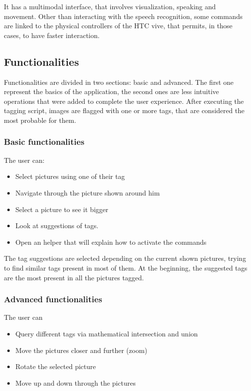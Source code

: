 \documentclass[11pt,a4paper]{article}
\begin{document}
It has a multimodal interface, that involves visualization, speaking and movement.
Other than interacting with the speech recognition, some commands are linked to the physical controllers of the HTC vive, that permits, in those cases, to have faster interaction.

\subsection{Functionalities}
Functionalities are divided in two sections: basic and advanced.
The first one represent the basics of the application, the second ones are less intuitive operations that were added to complete the user experience.
After executing the tagging script, images are flagged with one or more tags, that are considered the most probable for them.

\subsubsection{Basic functionalities}

The user can:
\begin{itemize}
\item Select pictures using one of their tag
\item Navigate through the picture shown around him
\item Select a picture to see it bigger 
\item Look at suggestions of tags.
\item Open an helper that will explain how to activate the commands
\end{itemize} 
The tag suggestions are selected depending on the current shown pictures, trying to find similar tags present in most of them.
At the beginning, the suggested tags are the most present in all the pictures tagged.


\subsubsection{Advanced functionalities}
The user can
\begin{itemize}
\item Query different tags via mathematical intersection and union
\item Move the pictures closer and further (zoom)
\item Rotate the selected picture
\item Move up and down through the pictures
\end{itemize}
\end{document}
